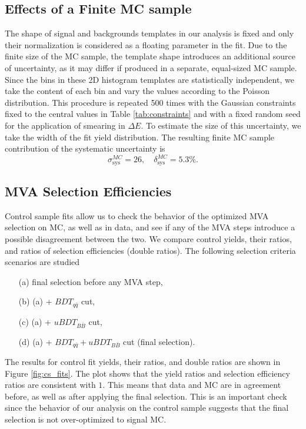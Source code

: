 \subsection{Effects of a Finite MC sample}
The shape of signal and backgrounds templates in our analysis is fixed and only their normalization is considered as a floating parameter in the fit. Due to the finite size of the MC sample, the template shape introduces an additional source of uncertainty, as it may differ if produced in a separate, equal-sized MC sample. Since the bins in these 2D histogram templates are statistically independent, we take the content of each bin and vary the values according to the Poisson distribution. This procedure is repeated 500 times with the Gaussian constraints fixed to the central values in Table \ref{tab:constraints} and with a fixed random seed for the application of smearing in $\Delta E$. To estimate the size of this uncertainty, we take the width of the fit yield distribution. The resulting finite MC sample contribution of the systematic uncertainty is
\begin{equation}
\sigma_{\mathrm{sys}}^{MC} = 26,\quad \delta_{\mathrm{sys}}^{MC} = 5.3\%.
\end{equation}


\subsection{MVA Selection Efficiencies}
Control sample fits allow us to check the behavior of the optimized MVA selection on MC, as well as in data, and see if any of the MVA steps introduce a possible disagreement between the two. We compare control yields, their ratios, and ratios of selection efficiencies (double ratios). The following selection criteria scenarios are studied
\begin{itemize}
	\item[(a)] final selection before any MVA step,
	\item[(b)] (a) + $BDT_{q\bar q}$ cut,
	\item[(c)] (a) + $uBDT_{B\bar B}$ cut,
	\item[(d)] (a) + $BDT_{q\bar q} + uBDT_{B\bar B}$ cut (final selection).
\end{itemize}

The results for control fit yields, their ratios, and double ratios are shown in Figure \ref{fig:cs_fits}. The plot shows that the yield ratios and selection efficiency ratios are consistent with $1$. This means that data and MC are in agreement before, as well as after applying the final selection. This is an important check since the behavior of our analysis on the control sample suggests that the final selection is not over-optimized to signal MC.

